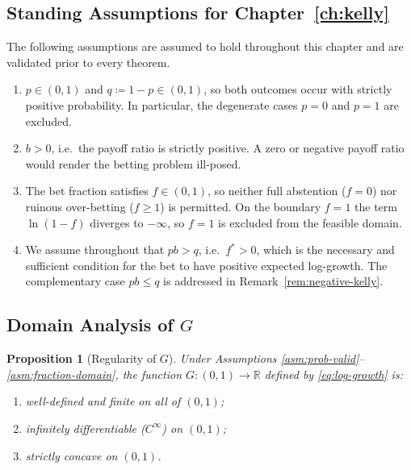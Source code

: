 \documentclass[12pt,openany]{book}
\numberwithin{equation}{chapter}
\theoremstyle{plain}
\newtheorem{proposition}[theorem]{Proposition}
\theoremstyle{definition}
\theoremstyle{remark}
\numberwithin{equation}{chapter}
\theoremstyle{plain}
\begin{document}
\subsection*{Standing Assumptions for Chapter~\ref{ch:kelly}}
\label{sec:kelly-assumptions}

The following assumptions are assumed to hold throughout this chapter
and are validated prior to every theorem.

\begin{enumerate}[label=\textbf{A\arabic*.}, leftmargin=*, widest=A9]
  \item \label{asm:prob-valid}
        $p \in (0, 1)$ and $q \coloneqq 1 - p \in (0, 1)$, so both
        outcomes occur with strictly positive probability.  In
        particular, the degenerate cases $p = 0$ and $p = 1$ are
        excluded.
  \item \label{asm:payoff-positive}
        $b > 0$, i.e.\ the payoff ratio is strictly positive.  A zero
        or negative payoff ratio would render the betting problem
        ill-posed.
  \item \label{asm:fraction-domain}
        The bet fraction satisfies $f \in (0, 1)$, so neither full
        abstention ($f = 0$) nor ruinous over-betting ($f \geq 1$) is
        permitted.  On the boundary $f = 1$ the term $\ln(1 - f)$
        diverges to $-\infty$, so $f = 1$ is excluded from the
        feasible domain.
  \item \label{asm:kelly-positive}
        We assume throughout that $pb > q$, i.e.\ $f^{*} > 0$, which
        is the necessary and sufficient condition for the bet to have
        positive expected log-growth.  The complementary case
        $pb \leq q$ is addressed in Remark~\ref{rem:negative-kelly}.
\end{enumerate}

\subsection*{Domain Analysis of $G$}
\label{sec:kelly-domain}

\begin{proposition}[Regularity of $G$]
\label{prop:G-regularity}
Under Assumptions \ref{asm:prob-valid}--\ref{asm:fraction-domain},
the function $G : (0,1) \to \mathbb{R}$ defined by
\eqref{eq:log-growth} is:
\begin{enumerate}[label=(\roman*)]
  \item well-defined and finite on all of $(0, 1)$;
  \item infinitely differentiable ($C^{\infty}$) on $(0, 1)$;
  \item strictly concave on $(0, 1)$.
\end{enumerate}
\end{proposition}
\end{document}
